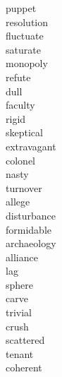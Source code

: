 \documentclass[a4paper, 11pt]{ctexart}
\begin{document}
\begin{multicols*}{3}
\begin{description}
\item[puppet]

\item[resolution]

\item[fluctuate]

\item[saturate]

\item[monopoly]

\item[refute]

\item[dull]

\item[faculty]

\item[rigid]

\item[skeptical]

\item[extravagant]

\item[colonel]

\item[nasty]

\item[turnover]

\item[allege]

\item[disturbance]

\item[formidable]

\item[archaeology]

\item[alliance]

\item[lag]

\item[sphere]

\item[carve]

\item[trivial]

\item[crush]

\item[scattered]

\item[tenant]

\item[coherent]


\end{description}
\end{multicols*}
\end{document}
